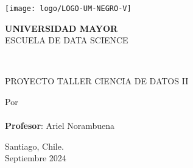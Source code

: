 \thispagestyle{empty}
\begin{center}
\singlespace
    \texttt{[image: logo/LOGO-UM-NEGRO-V]}\\
    \vspace{0.8cm}
    \begin{large}
        \textbf{UNIVERSIDAD MAYOR}\\
        \vspace{0.3cm}
        ESCUELA DE DATA SCIENCE\\
        \vspace{1.6cm}
    \end{large}
    \begin{large}
        \textbf{\MakeUppercase{\newtitle}}\\
        \vspace{1.6cm}
    \end{large}
    \begin{large}
        PROYECTO TALLER CIENCIA DE DATOS II\\
        \vspace{1cm}

        Por\\
        \vspace{1cm}\textbf{\MakeUppercase{\newauthor}}\\
        \vspace{1.4cm}
        \textbf{Profesor}:  Ariel Norambuena \\ %
        \vspace{0.6cm}

        \vspace{1cm}
        Santiago, Chile.\\
        Septiembre 2024 %
    \end{large}
\end{center}
